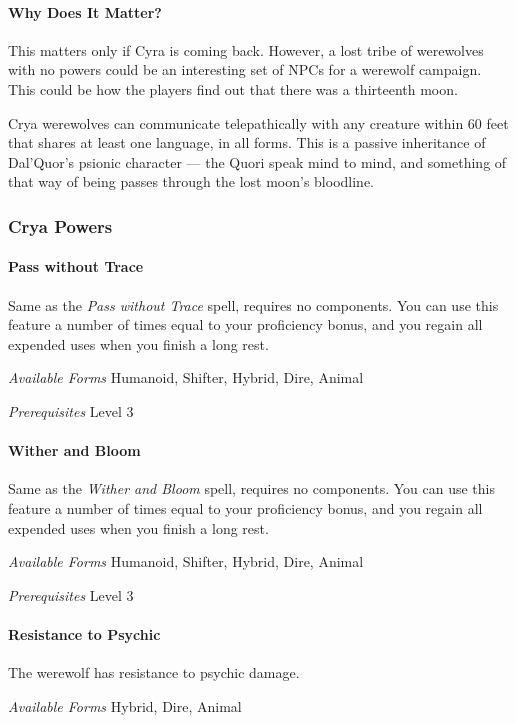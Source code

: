 \documentclass[twocolumn]{dndbook}
\begin{document}
\paragraph*{Why Does It Matter?}
This matters only if Cyra is coming back.
However, a lost tribe of werewolves with no powers could be an interesting set of NPCs for a werewolf campaign.
This could be how the players find out that there was a thirteenth moon.\par



Crya werewolves can communicate telepathically with any creature within 60 feet that shares at least one language, in all forms.
This is a passive inheritance of Dal'Quor's psionic character --- the Quori speak mind to mind, and something of that way of being passes through the lost moon's bloodline.

\subsubsection{Crya Powers}

\paragraph*{Pass without Trace}
Same as the \emph{Pass without Trace} spell, requires no components.
You can use this feature a number of times equal to your proficiency bonus, and you regain all expended uses when you finish a long rest.\par
\emph{Available Forms} Humanoid, Shifter, Hybrid, Dire, Animal\par
\emph{Prerequisites} Level 3\par

\paragraph*{Wither and Bloom}
Same as the \emph{Wither and Bloom} spell, requires no components.
You can use this feature a number of times equal to your proficiency bonus, and you regain all expended uses when you finish a long rest.\par
\emph{Available Forms} Humanoid, Shifter, Hybrid, Dire, Animal\par
\emph{Prerequisites} Level 3\par

\paragraph*{Resistance to Psychic}
The werewolf has resistance to psychic damage.\par
\emph{Available Forms} Hybrid, Dire, Animal\par
\end{document}

